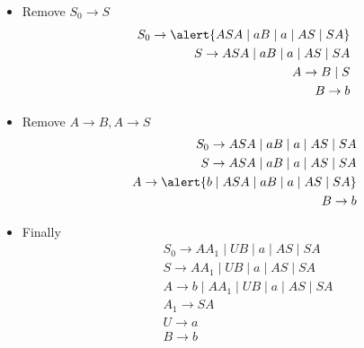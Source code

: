 \begin{frame}[allowframebreaks]
\begin{itemize}
\item Remove $S_0 \rightarrow S$
  \begin{eqnarray*}
&& S_0 \rightarrow \alert{ASA\mid aB\mid a \mid AS\mid SA}\\
&& S \rightarrow ASA\mid aB\mid a \mid AS \mid SA\\
&& A \rightarrow B\mid S\\
&& B \rightarrow b
\end{eqnarray*}

\item Remove $A\rightarrow B, A\rightarrow S$
  \begin{eqnarray*}
&& S_0 \rightarrow ASA\mid aB\mid a \mid AS\mid SA\\
&& S \rightarrow ASA\mid aB\mid a \mid AS \mid SA\\
&& A \rightarrow \alert{b \mid ASA \mid aB\mid a \mid AS \mid SA}\\
&& B \rightarrow b
\end{eqnarray*}
\item Finally
\begin{eqnarray*}
&& S_0 \rightarrow AA_1\mid UB\mid a \mid AS\mid SA\\
&& S \rightarrow AA_1 \mid UB\mid  a \mid AS \mid SA\\
&& A \rightarrow b \mid AA_1 \mid UB\mid a \mid AS \mid SA\\
&& A_1 \rightarrow SA\\
&& U \rightarrow a\\
&& B \rightarrow b\\
  \end{eqnarray*}

\end{itemize}\end{frame}



